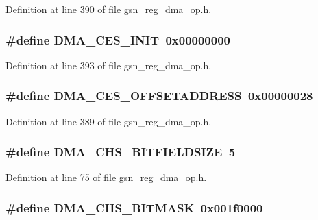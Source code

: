 Definition at line 390 of file gsn\_\-reg\_\-dma\_\-op.h.

\hypertarget{a00547_ac640871d7a2d0fea50fe89e96deb3f4a}{
\subsubsection[{DMA\_\-CES\_\-INIT}]{\setlength{\rightskip}{0pt plus 5cm}\#define DMA\_\-CES\_\-INIT~0x00000000}}
\label{a00547_ac640871d7a2d0fea50fe89e96deb3f4a}


Definition at line 393 of file gsn\_\-reg\_\-dma\_\-op.h.

\hypertarget{a00547_af8ae013ff52a23e48cd01f345547195e}{
\subsubsection[{DMA\_\-CES\_\-OFFSETADDRESS}]{\setlength{\rightskip}{0pt plus 5cm}\#define DMA\_\-CES\_\-OFFSETADDRESS~0x00000028}}
\label{a00547_af8ae013ff52a23e48cd01f345547195e}


Definition at line 389 of file gsn\_\-reg\_\-dma\_\-op.h.

\hypertarget{a00547_a134f4735b50e2d6636b7c082b2057f14}{
\subsubsection[{DMA\_\-CHS\_\-BITFIELDSIZE}]{\setlength{\rightskip}{0pt plus 5cm}\#define DMA\_\-CHS\_\-BITFIELDSIZE~5}}
\label{a00547_a134f4735b50e2d6636b7c082b2057f14}


Definition at line 75 of file gsn\_\-reg\_\-dma\_\-op.h.

\hypertarget{a00547_a206b7f6a5fd6825d63adce73eb67d29d}{
\subsubsection[{DMA\_\-CHS\_\-BITMASK}]{\setlength{\rightskip}{0pt plus 5cm}\#define DMA\_\-CHS\_\-BITMASK~0x001f0000}}
\label{a00547_a206b7f6a5fd6825d63adce73eb67d29d}


